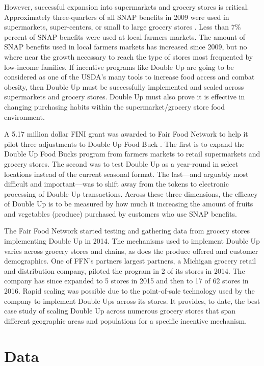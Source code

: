 \documentclass[11pt,letterpaperpaper,]{book}
\begin{document}
However, successful expansion into supermarkets and grocery stores is
critical. Approximately three-quarters of all SNAP benefits in 2009 were
used in supermarkets, super-centers, or small to large grocery stores
\citep{castner_benefit_2011}. Less than 7\% percent of SNAP benefits
were used at local farmers markets. The amount of SNAP benefits used in
local farmers markets has increased since 2009, but no where near the
growth necessary to reach the type of stores most frequented by
low-income families. If incentive programs like Double Up are going to
be considered as one of the USDA's many tools to increase food access
and combat obesity, then Double Up must be successfully implemented and
scaled across supermarkets and grocery stores. Double Up must also prove
it is effective in changing purchasing habits within the
supermarket/grocery store food environment.

A 5.17 million dollar FINI grant was awarded to Fair Food Network to
help it pilot three adjustments to Double Up Food Buck
\citep{usda_nifa_usda_2015}. The first is to expand the Double Up Food
Bucks program from farmers markets to retail supermarkets and grocery
stores. The second was to test Double Up as a year-round in select
locations instead of the current seasonal format. The last---and
arguably most difficult and important---was to shift away from the
tokens to electronic processing of Double Up transactions. Across these
three dimensions, the efficacy of Double Up is to be measured by how
much it increasing the amount of fruits and vegetables (produce)
purchased by customers who use SNAP benefits.

The Fair Food Network started testing and gathering data from grocery
stores implementing Double Up in 2014. The mechanisms used to implement
Double Up varies across grocery stores and chains, as does the produce
offered and customer demographics. One of FFN's partners largest
partners, a Michigan grocery retail and distribution company, piloted
the program in 2 of its stores in 2014. The company has since expanded
to 5 stores in 2015 and then to 17 of 62 stores in 2016. Rapid scaling
was possible due to the point-of-sale technology used by the company to
implement Double Ups across its stores. It provides, to date, the best
case study of scaling Double Up across numerous grocery stores that span
different geographic areas and populations for a specific incentive
mechanism.

\section{Data}\label{data}
\end{document}
